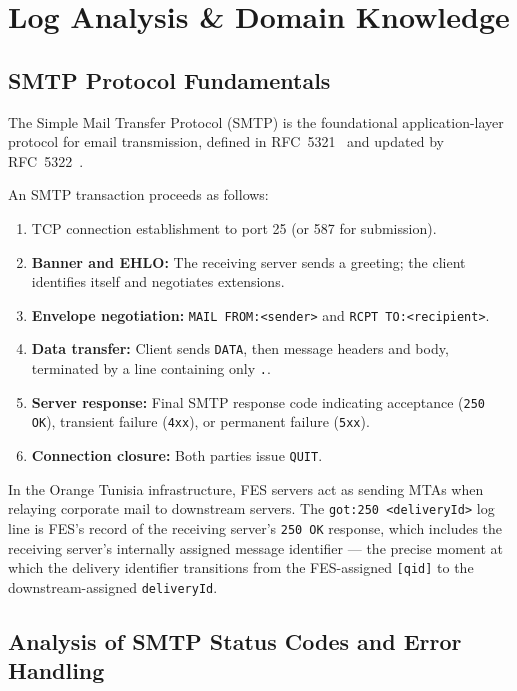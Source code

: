 \documentclass[12pt,a4paper,oneside]{report}
\begin{document}
\section{Log Analysis \& Domain Knowledge}

\subsection{SMTP Protocol Fundamentals}

The Simple Mail Transfer Protocol (SMTP) is the foundational application-layer protocol for email transmission, defined in RFC~5321~\cite{rfc5321} and updated by RFC~5322~\cite{rfc5322}.

An SMTP transaction proceeds as follows:
\begin{enumerate}
  \item TCP connection establishment to port 25 (or 587 for submission).
  \item \textbf{Banner and EHLO:} The receiving server sends a greeting; the client identifies itself and negotiates extensions.
  \item \textbf{Envelope negotiation:} \texttt{MAIL FROM:<sender>} and \texttt{RCPT TO:<recipient>}.
  \item \textbf{Data transfer:} Client sends \texttt{DATA}, then message headers and body, terminated by a line containing only \texttt{.}.
  \item \textbf{Server response:} Final SMTP response code indicating acceptance (\texttt{250 OK}), transient failure (\texttt{4xx}), or permanent failure (\texttt{5xx}).
  \item \textbf{Connection closure:} Both parties issue \texttt{QUIT}.
\end{enumerate}

In the Orange Tunisia infrastructure, FES servers act as sending MTAs when relaying corporate mail to downstream servers.
The \texttt{got:250 <deliveryId>} log line is FES's record of the receiving server's \texttt{250 OK} response, which includes the receiving server's internally assigned message identifier --- the precise moment at which the delivery identifier transitions from the FES-assigned \texttt{[qid]} to the downstream-assigned \texttt{deliveryId}.

\subsection{Analysis of SMTP Status Codes and Error Handling}
\end{document}
